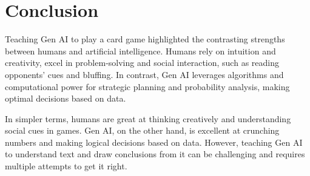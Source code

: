 \documentclass[a4paper]{article}
\begin{document}
\section{Conclusion}
Teaching Gen AI to play a card game highlighted the contrasting strengths between humans and artificial intelligence. Humans rely on intuition and creativity, excel in problem-solving and social interaction, such as reading opponents' cues and bluffing. In contrast, Gen AI leverages algorithms and computational power for strategic planning and probability analysis, making optimal decisions based on data.

In simpler terms, humans are great at thinking creatively and understanding social cues in games. Gen AI, on the other hand, is excellent at crunching numbers and making logical decisions based on data. However, teaching Gen AI to understand text and draw conclusions from it can be challenging and requires multiple attempts to get it right.
\end{document}
